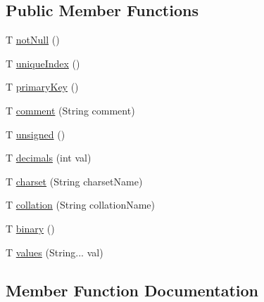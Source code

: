 \subsection*{Public Member Functions}
\begin{DoxyCompactItemize}
\item 
T \mbox{\hyperlink{interfacecom_1_1mysql_1_1cj_1_1xdevapi_1_1_column_definition_a388999f4f1ecded45bcab008620c3550}{not\+Null}} ()
\item 
T \mbox{\hyperlink{interfacecom_1_1mysql_1_1cj_1_1xdevapi_1_1_column_definition_afa9fbc02160fd06cb9f028d1c347b253}{unique\+Index}} ()
\item 
T \mbox{\hyperlink{interfacecom_1_1mysql_1_1cj_1_1xdevapi_1_1_column_definition_ab7fc68e92f18f5fcb15f652f2587eab2}{primary\+Key}} ()
\item 
T \mbox{\hyperlink{interfacecom_1_1mysql_1_1cj_1_1xdevapi_1_1_column_definition_a1e9b514a5ec7e14fef594dcf536c80f9}{comment}} (String comment)
\item 
T \mbox{\hyperlink{interfacecom_1_1mysql_1_1cj_1_1xdevapi_1_1_column_definition_abe86aa00052be4e29734c7bdb429031a}{unsigned}} ()
\item 
T \mbox{\hyperlink{interfacecom_1_1mysql_1_1cj_1_1xdevapi_1_1_column_definition_a087f6841428ccc03564a11af61a7d66d}{decimals}} (int val)
\item 
T \mbox{\hyperlink{interfacecom_1_1mysql_1_1cj_1_1xdevapi_1_1_column_definition_ae287cbf6c79408b4626bf68c4bf6ea7b}{charset}} (String charset\+Name)
\item 
T \mbox{\hyperlink{interfacecom_1_1mysql_1_1cj_1_1xdevapi_1_1_column_definition_a9cb72f8fcdfe353f3d0576baf42254cc}{collation}} (String collation\+Name)
\item 
T \mbox{\hyperlink{interfacecom_1_1mysql_1_1cj_1_1xdevapi_1_1_column_definition_a0f286696c0f88c6b8116ec9ddd3c50f3}{binary}} ()
\item 
T \mbox{\hyperlink{interfacecom_1_1mysql_1_1cj_1_1xdevapi_1_1_column_definition_ab28c155a4120df4d53ed66cf19221524}{values}} (String... val)
\end{DoxyCompactItemize}


\subsection{Member Function Documentation}
\mbox{\label{interfacecom_1_1mysql_1_1cj_1_1xdevapi_1_1_column_definition_a0f286696c0f88c6b8116ec9ddd3c50f3}} 

